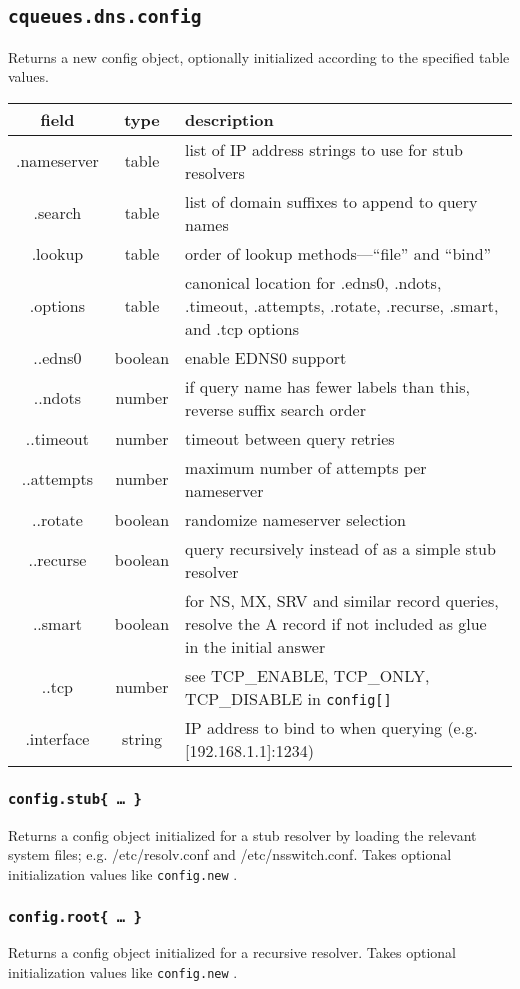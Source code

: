 \documentclass[11pt, oneside]{memoir}
\newcommand{\fn}[1]{\texttt{#1} }
\newcounter{toccols}
\newenvironment{Module}[1]{
	\subsection{\texttt{#1}}
	\addtocontents{toc}{
		\protect\begin{multicols}{\value{toccols}}
	}
}{
	\addtocontents{toc}{\protect\end{multicols}}
}
\begin{document}
\begin{Module}{cqueues.dns.config}
Returns a new config object, optionally initialized according to the specified table values.

\begin{tabular}{ c | c | p{5in} }
field & type & description\\\hline
.nameserver & table & list of IP address strings to use for stub resolvers\\
.search & table & list of domain suffixes to append to query names\\
.lookup & table & order of lookup methods---``file'' and ``bind''\\
.options & table & canonical location for .edns0, .ndots, .timeout, .attempts, .rotate, .recurse, .smart, and .tcp options\\
..edns0 & boolean & enable EDNS0 support\\
..ndots & number & if query name has fewer labels than this, reverse suffix search order\\
..timeout & number & timeout between query retries\\
..attempts & number & maximum number of attempts per nameserver\\
..rotate & boolean & randomize nameserver selection\\
..recurse & boolean & query recursively instead of as a simple stub resolver\\
..smart & boolean & for NS, MX, SRV and similar record queries, resolve the A record if not included as glue in the initial answer\\
..tcp & number & see TCP\_ENABLE, TCP\_ONLY, TCP\_DISABLE in \fn{config[]}\\
.interface & string & IP address to bind to when querying (e.g. [192.168.1.1]:1234)
\end{tabular}
\subsubsection[\fn{config.stub}]{\fn{config.stub\{ … \}}}

Returns a config object initialized for a stub resolver by loading the relevant system files; e.g. /etc/resolv.conf and /etc/nsswitch.conf. Takes optional initialization values like \fn{config.new}.

\subsubsection[\fn{config.root}]{\fn{config.root\{ … \}}}

Returns a config object initialized for a recursive resolver. Takes optional initialization values like \fn{config.new}.


\end{Module}
\end{document}
